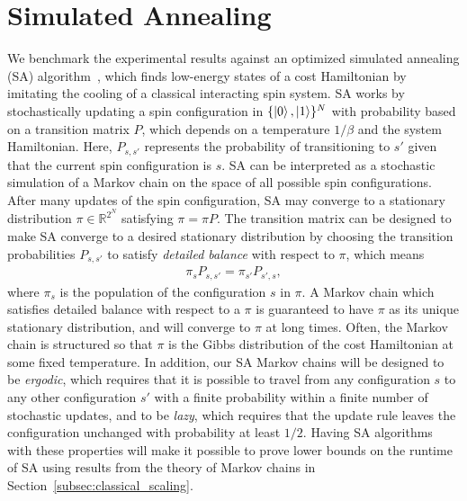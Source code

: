 \documentclass[twocolumn,amssymb,secnumarabic, prl, aps, nofootinbib]{revtex4-1}
\begin{document}
\section{Simulated Annealing \label{Sec:sa}}
We benchmark the experimental results against an optimized simulated annealing (SA) algorithm~\cite{Henderson2003, markov_chain_mixing}, which finds low-energy states of a cost Hamiltonian by imitating the cooling of a classical interacting spin system.  SA works by stochastically updating a spin configuration in  $\{\ket{0}, \ket{1}\}^N$ with probability based on a transition matrix $P$, which depends on a temperature $1/\beta$ and the system Hamiltonian. Here, $P_{s, s'}$ represents the probability of transitioning to $s'$ given that the current spin configuration is $s$. SA can be interpreted as a stochastic simulation of a  Markov chain on the space of all possible spin configurations. After many updates of the spin configuration, SA may converge to a stationary distribution $\pi\in\mathbb{R}^{2^N}$ satisfying $\pi = \pi P.$ The transition matrix can be designed to make SA converge to a desired stationary distribution by choosing the transition probabilities $P_{s, s'}$ to satisfy \textit{detailed balance} with respect to $\pi$, which means
\begin{align}
	\pi_s P_{s, s'} = \pi_{s'} P_{s', s},
	\label{eq:detailed_balance}
\end{align}
where $\pi_s$ is the population of the configuration $s$ in $\pi$. A Markov chain which satisfies detailed balance with respect to a $\pi$ is guaranteed to have $\pi$ as its unique stationary distribution, and will converge to $\pi$ at long times. Often, the Markov chain is structured so that $\pi$ is the Gibbs distribution of the cost Hamiltonian at some fixed temperature. In addition, our SA Markov chains will be designed to be \textit{ergodic}, which requires that it is possible to travel from any configuration $s$ to any other configuration $s'$ with a finite probability within a finite number of stochastic updates, and to be \textit{lazy}, which requires that the update rule leaves the configuration unchanged with probability at least $1/2$. Having SA algorithms with these properties will make it possible to prove lower bounds on the runtime of SA using results from the theory of Markov chains in Section~\ref{subsec:classical_scaling}.
\end{document}
